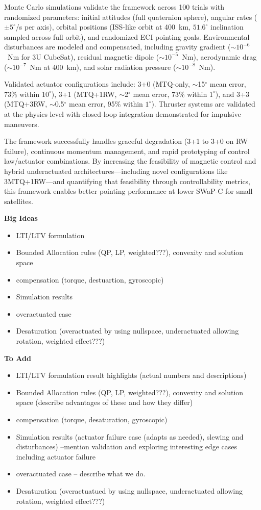 \documentclass[conference]{IEEEtran}
\begin{document}
Monte Carlo simulations validate the framework across 100 trials with randomized parameters: initial attitudes (full quaternion sphere), angular rates ($\pm5^\circ$/s per axis), orbital positions (ISS-like orbit at 400~km, $51.6^\circ$ inclination sampled across full orbit), and randomized ECI pointing goals. Environmental disturbances are modeled and compensated, including gravity gradient ($\sim10^{-6}$~Nm for 3U CubeSat), residual magnetic dipole ($\sim10^{-5}$~Nm), aerodynamic drag ($\sim10^{-7}$~Nm at 400~km), and solar radiation pressure ($\sim10^{-8}$~Nm).

Validated actuator configurations include: 3+0 (MTQ-only, $\sim$15$^\circ$ mean error, 73\% within $10^\circ$), 3+1 (MTQ+1RW, $\sim$2$^\circ$ mean error, 73\% within $1^\circ$), and 3+3 (MTQ+3RW, $\sim$0.5$^\circ$ mean error, 95\% within $1^\circ$). Thruster systems are validated at the physics level with closed-loop integration demonstrated for impulsive maneuvers.

The framework successfully handles graceful degradation (3+1 to 3+0 on RW failure), continuous momentum management, and rapid prototyping of control law/actuator combinations. By increasing the feasibility of magnetic control and hybrid underactuated architectures---including novel configurations like 3MTQ+1RW---and quantifying that feasibility through controllability metrics, this framework enables better pointing performance at lower SWaP-C for small satellites.

\textbf{Big Ideas}
\begin{itemize}
    \item LTI/LTV formulation
    \item Bounded Allocation rules (QP, LP, weighted???), convexity and solution space
    \item compensation (torque, destuartion, gyroscopic)
    \item Simulation results
    \item overactuated case
    \item Desaturation (overactuated by using nullspace, underactuated allowing rotation, weighted effect???)
\end{itemize}

\textbf{To Add}
\begin{itemize}
    \item LTI/LTV formulation result highlights (actual numbers and descriptions)
    \item Bounded Allocation rules (QP, LP, weighted???), convexity and solution space (describe advantages of these and how they differ)
    \item compensation (torque, desaturation, gyroscopic)
    \item Simulation results (actuator failure case (adapts as needed), slewing and disturbances) --mention validation and exploring interesting edge cases including actuator failure
    \item overactuated case -- describe what we do.
    \item Desaturation (overactuatued by using nullspace, underactuated allowing rotation, weighted effect???)
\end{itemize}
\end{document}
